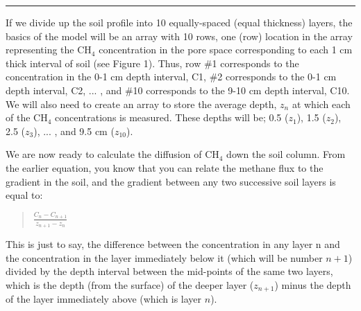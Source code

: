 \documentclass{tufte-book} %
\newenvironment{docspec}{\begin{quotation}\ttfamily\parskip0pt\parindent0pt\ignorespaces}{\end{quotation}}
\begin{document}
\vspace{1mm}
\noindent\rule{4cm}{0.5pt}
\vspace{2mm}


\noindent If we divide up the soil profile into 10 equally-spaced (equal thickness) layers, the basics of the model will be an array with 10 rows, one (row) location in the array representing the CH\(_{4}\) concentration in the pore space corresponding to each 1 cm thick interval of soil (see Figure 1). Thus, row \#1 corresponds to the concentration in the 0-1 cm depth interval, C1, \#2 corresponds to the 0-1 cm depth interval, C2, ... , and \#10 corresponds to the 9-10 cm depth interval, C10. We will also need to create an array to store the average depth, \(z_{n}\) at which each of the CH\(_{4}\) concentrations is measured. These depths will be; 0.5 (\(z_{1}\)), 1.5 (\(z_{2}\)), 2.5 (\(z_{3}\)), ... , and 9.5 cm (\(z_{10}\)).

We are now ready to calculate the diffusion of CH\(_{4}\) down the soil column. From the earlier equation, you know that you can relate the methane flux to the gradient in the soil, and the gradient between any two successive soil layers is equal to:
\begin{docspec}
\(\frac{C_{n} - C_{n+1}}{z_{n+1} - z_{n}}\)
\end{docspec}
This is just to say, the difference between the concentration in any layer n and the concentration in the layer immediately below it (which will be number \(n+1\)) divided by the depth interval between the mid-points of the same two layers, which is the depth (from the surface) of the deeper layer (\(z_{n+1}\)) minus the depth of the layer immediately above (which is layer \(n\)).
\end{document}
